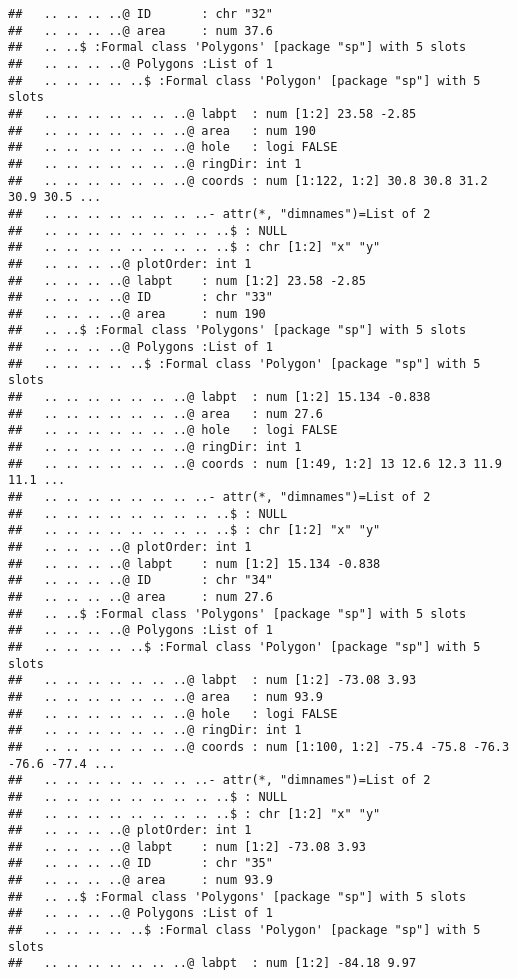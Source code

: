 \documentclass[]{article}
\begin{document}
\begin{verbatim}
##   .. .. .. ..@ ID       : chr "32"
##   .. .. .. ..@ area     : num 37.6
##   .. ..$ :Formal class 'Polygons' [package "sp"] with 5 slots
##   .. .. .. ..@ Polygons :List of 1
##   .. .. .. .. ..$ :Formal class 'Polygon' [package "sp"] with 5 slots
##   .. .. .. .. .. .. ..@ labpt  : num [1:2] 23.58 -2.85
##   .. .. .. .. .. .. ..@ area   : num 190
##   .. .. .. .. .. .. ..@ hole   : logi FALSE
##   .. .. .. .. .. .. ..@ ringDir: int 1
##   .. .. .. .. .. .. ..@ coords : num [1:122, 1:2] 30.8 30.8 31.2 30.9 30.5 ...
##   .. .. .. .. .. .. .. ..- attr(*, "dimnames")=List of 2
##   .. .. .. .. .. .. .. .. ..$ : NULL
##   .. .. .. .. .. .. .. .. ..$ : chr [1:2] "x" "y"
##   .. .. .. ..@ plotOrder: int 1
##   .. .. .. ..@ labpt    : num [1:2] 23.58 -2.85
##   .. .. .. ..@ ID       : chr "33"
##   .. .. .. ..@ area     : num 190
##   .. ..$ :Formal class 'Polygons' [package "sp"] with 5 slots
##   .. .. .. ..@ Polygons :List of 1
##   .. .. .. .. ..$ :Formal class 'Polygon' [package "sp"] with 5 slots
##   .. .. .. .. .. .. ..@ labpt  : num [1:2] 15.134 -0.838
##   .. .. .. .. .. .. ..@ area   : num 27.6
##   .. .. .. .. .. .. ..@ hole   : logi FALSE
##   .. .. .. .. .. .. ..@ ringDir: int 1
##   .. .. .. .. .. .. ..@ coords : num [1:49, 1:2] 13 12.6 12.3 11.9 11.1 ...
##   .. .. .. .. .. .. .. ..- attr(*, "dimnames")=List of 2
##   .. .. .. .. .. .. .. .. ..$ : NULL
##   .. .. .. .. .. .. .. .. ..$ : chr [1:2] "x" "y"
##   .. .. .. ..@ plotOrder: int 1
##   .. .. .. ..@ labpt    : num [1:2] 15.134 -0.838
##   .. .. .. ..@ ID       : chr "34"
##   .. .. .. ..@ area     : num 27.6
##   .. ..$ :Formal class 'Polygons' [package "sp"] with 5 slots
##   .. .. .. ..@ Polygons :List of 1
##   .. .. .. .. ..$ :Formal class 'Polygon' [package "sp"] with 5 slots
##   .. .. .. .. .. .. ..@ labpt  : num [1:2] -73.08 3.93
##   .. .. .. .. .. .. ..@ area   : num 93.9
##   .. .. .. .. .. .. ..@ hole   : logi FALSE
##   .. .. .. .. .. .. ..@ ringDir: int 1
##   .. .. .. .. .. .. ..@ coords : num [1:100, 1:2] -75.4 -75.8 -76.3 -76.6 -77.4 ...
##   .. .. .. .. .. .. .. ..- attr(*, "dimnames")=List of 2
##   .. .. .. .. .. .. .. .. ..$ : NULL
##   .. .. .. .. .. .. .. .. ..$ : chr [1:2] "x" "y"
##   .. .. .. ..@ plotOrder: int 1
##   .. .. .. ..@ labpt    : num [1:2] -73.08 3.93
##   .. .. .. ..@ ID       : chr "35"
##   .. .. .. ..@ area     : num 93.9
##   .. ..$ :Formal class 'Polygons' [package "sp"] with 5 slots
##   .. .. .. ..@ Polygons :List of 1
##   .. .. .. .. ..$ :Formal class 'Polygon' [package "sp"] with 5 slots
##   .. .. .. .. .. .. ..@ labpt  : num [1:2] -84.18 9.97

\end{verbatim}
\end{document}
